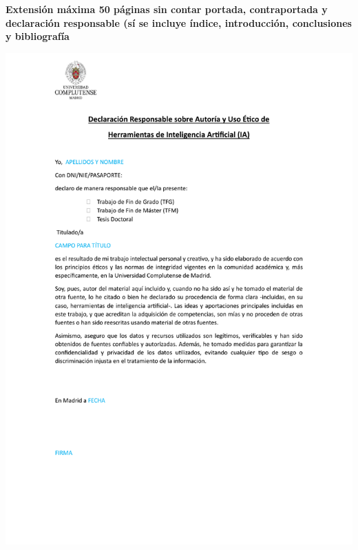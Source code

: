 \documentclass[11pt, a4paper]{article} %
\begin{document}
{\Large\textbf{Extensión máxima 50 páginas sin contar portada, contraportada y declaración responsable (sí se incluye índice, introducción, conclusiones y bibliografía}}
\newpage

% 
% 
% 

\includegraphics[width=1\textwidth]{./normas-documentacion/iadeclaracion.pdf}
\newpage


\tableofcontents
\end{document}
